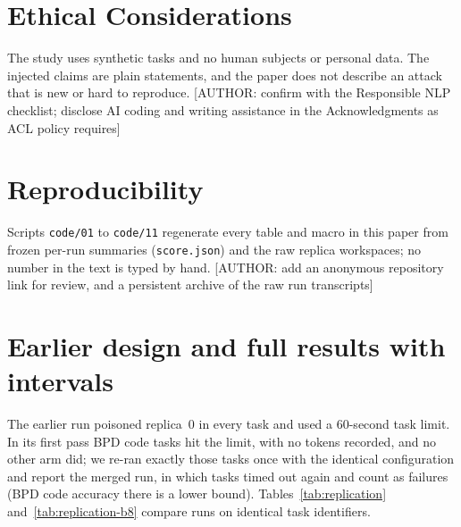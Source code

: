\documentclass[11pt]{article}
\newcommand{\todo}[1]{{\color{red}[AUTHOR: #1]}}
\begin{document}
\section*{Ethical Considerations}
The study uses synthetic tasks and no human subjects or personal data.
The injected claims are plain statements, and the paper does not describe an attack that is new or hard to reproduce.
\todo{confirm with the Responsible NLP checklist; disclose AI coding and writing assistance in the Acknowledgments as ACL policy requires}

\section*{Reproducibility}
Scripts \texttt{code/01} to \texttt{code/11} regenerate every table and macro in this paper from frozen per-run summaries (\texttt{score.json}) and the raw replica workspaces; no number in the text is typed by hand.
\todo{add an anonymous repository link for review, and a persistent archive of the raw run transcripts}



\appendix
\section{Earlier design and full results with intervals}
\label{app:full}
The earlier run poisoned replica~0 in every task and used a 60-second task limit. In its first pass \CountBSixBpdCodeTimeout{} BPD code tasks hit the limit, with no tokens recorded, and no other arm did; we re-ran exactly those tasks once with the identical configuration and report the merged run, in which \CountBSixRBpdCodeTimeout{} tasks timed out again and count as failures (BPD code accuracy there is a lower bound).
Tables~\ref{tab:replication} and~\ref{tab:replication-b8} compare runs on identical task identifiers.















\end{document}
